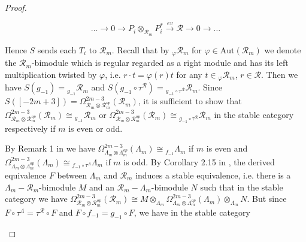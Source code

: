 \documentclass[12pt]{amsart}
\theoremstyle{plain}
\theoremstyle{remark}
\theoremstyle{definition}
\newcommand{\Aut}{{\mathrm{Aut}}}
\begin{document}
\begin{proof}
\begin{enumerate}
$$ \dots \to 0 \to P_i \otimes_{\mathcal{R}_m} P_i^* \xrightarrow{ev} \mathcal{R} \to 0 \to \dots $$ 

Hence $S$ sends each $T_i$ to $\mathcal{R}_m$. Recall that by ${}_\varphi \mathcal{R}_m$ for $\varphi \in \Aut(\mathcal{R}_m)$ we denote the $\mathcal{R}_m$-bimodule which is regular regarded as a right module and has its left multiplication twisted by $\varphi$, i.e. $r \cdot t = \varphi(r)t$ for any $t \in {}_\varphi \mathcal{R}_m$, $r \in \mathcal{R}$. Then we have $S(g_{-1}) = {}_{g_{-1}}\mathcal{R}_m$ and ${S(g_{-1} \circ \tau^{\mathcal{R}}) = {}_{g_{-1}\circ \tau^{\mathcal{R}}}\mathcal{R}_m }$. Since $S([-2m+3]) = \Omega^{2m-3}_{\mathcal{R}_m \otimes \mathcal{R}^{op}_m} (\mathcal{R}_m)$, it is sufficient to show that $\Omega^{2m-3}_{\mathcal{R}_m \otimes \mathcal{R}^{op}_m} (\mathcal{R}_m) \cong {}_{g_{-1}}\mathcal{R}_m$ or ${\Omega^{2m-3}_{\mathcal{R}_m \otimes \mathcal{R}^{op}_m} (\mathcal{R}_m) \cong {}_{g_{-1}\circ \tau^{\mathcal{R}}}\mathcal{R}_m}$ in the stable category respectively if $m$ is even or odd.

By Remark 1 in \cite{GV} we have $\Omega^{2m-3}_{\Lambda_m \otimes \Lambda^{op}_m} (\Lambda_m) \cong {}_{f_{-1}} \Lambda_m$ if $m$ is even and $\Omega^{2m-3}_{\Lambda_m \otimes \Lambda^{op}_m} (\Lambda_m) \cong {}_{f_{-1}\circ \tau^{\Lambda}} \Lambda_m$ if $m$ is odd. By Corollary 2.15 in \cite{RZ}, the derived equivalence $F$ between $\Lambda_m$ and $\mathcal{R}_m$ induces a stable equivalence, i.e. there is a $\Lambda_m-\mathcal{R}_m$-bimodule $M$ and an $\mathcal{R}_m-\Lambda_m$-bimodule $N$ such that in the stable category we have $\Omega^{2m-3}_{\mathcal{R}_m \otimes \mathcal{R}^{op}_m} (\mathcal{R}_m) \cong M \otimes_{\Lambda_m} \Omega^{2m-3}_{\Lambda_m \otimes \Lambda^{op}_m} (\Lambda_m) \otimes_{\Lambda_m} N$. But since $F \circ \tau^{\Lambda} =  \tau^{\mathcal{R}} \circ F$ and $F \circ f_{-1} =  g_{-1} \circ F$, we have in the stable category


\end{enumerate}
\end{proof}
\end{document}
